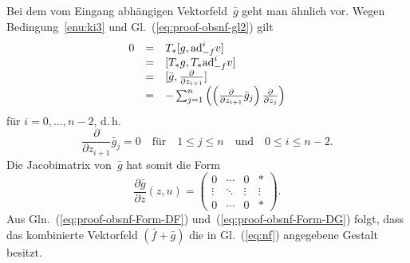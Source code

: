 \begin{svmultproof2}
Bei dem vom Eingang abhängigen Vektorfeld~$\bar{g}$ geht man ähnlich
vor. Wegen Bedingung~\ref{enu:ki3} und Gl.~(\ref{eq:proof-obsnf-gl2})
gilt 
\[
\begin{array}{ccl}
0 & = & T_{*}[g,{\operatorname{ad}}_{-f}^{i}v]\\
 & = & [T_{*}g,T_{*}{\operatorname{ad}}_{-f}^{i}v]\\
 & = & [\bar{g},\frac{\partial}{\partial z_{i+1}}]\\
 & = & -\sum_{j=1}^{n}\left(\left(\tfrac{\partial}{\partial z_{i+1}}\bar{g}_{j}\right)\tfrac{\partial}{\partial z_{j}}\right)
\end{array}
\]
für $i=0,\ldots,n-2$, d.\,h. 
\[
\frac{\partial}{\partial z_{i+1}}\bar{g}_{j}=0\quad\mbox{für}\quad1\leq j\leq n\quad\mbox{und}\quad0\leq i\leq n-2.
\]
Die Jacobimatrix von~$\bar{g}$ hat somit die Form 
\begin{equation}
\frac{\partial\bar{g}}{\partial z}(z,u)=\left(\begin{array}{ccc|c}
0 & \cdots & 0 & *\\
\vdots & \ddots & \vdots & \vdots\\
0 & \cdots & 0 & *
\end{array}\right).\label{eq:proof-obsnf-Form-DG}
\end{equation}
Aus Gln.~(\ref{eq:proof-obsnf-Form-DF}) und~(\ref{eq:proof-obsnf-Form-DG})
folgt, dass das kombinierte Vektorfeld $(\bar{f}+\bar{g})$ die in
Gl.~(\ref{eq:nf}) angegebene Gestalt besitzt.


\end{svmultproof2}

